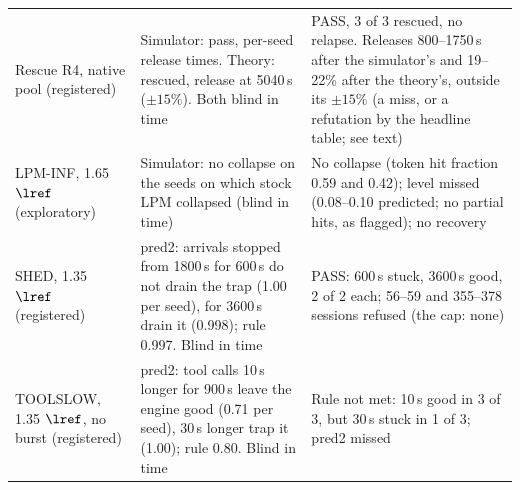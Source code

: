 \begin{table}[!tp]
\begin{tabular}{@{}>{\raggedright\arraybackslash}p{3.0cm} >{\raggedright\arraybackslash}p{7.4cm} >{\raggedright\arraybackslash}p{6.5cm}@{}}
\addlinespace[0.3pt]
Rescue R4, native pool (registered) & Simulator: pass, per-seed release times. Theory: rescued, release at 5040\,s ($\pm15\%$). Both blind in time & PASS, 3 of 3 rescued, no relapse. Releases 800--1750\,s after the simulator's and 19--22\% after the theory's, outside its $\pm15\%$ (a miss, or a refutation by the headline table; see text)\\
\addlinespace[0.3pt]
LPM-INF, 1.65 $\lref$ (exploratory) & Simulator: no collapse on the seeds on which stock LPM collapsed (blind in time) & No collapse (token hit fraction 0.59 and 0.42); level missed (0.08--0.10 predicted; no partial hits, as flagged); no recovery\\
\addlinespace[0.3pt]
SHED, 1.35 $\lref$ (registered) & pred2: arrivals stopped from 1800\,s for 600\,s do not drain the trap (1.00 per seed), for 3600\,s drain it (0.998); rule 0.997. Blind in time & PASS: 600\,s stuck, 3600\,s good, 2 of 2 each; 56--59 and 355--378 sessions refused (the cap: none)\\
\addlinespace[0.3pt]
TOOLSLOW, 1.35 $\lref$, no burst (registered) & pred2: tool calls 10\,s longer for 900\,s leave the engine good (0.71 per seed), 30\,s longer trap it (1.00); rule 0.80. Blind in time & Rule not met: 10\,s good in 3 of 3, but 30\,s stuck in 1 of 3; pred2 missed\\
\bottomrule
\end{tabular}
\end{table}

